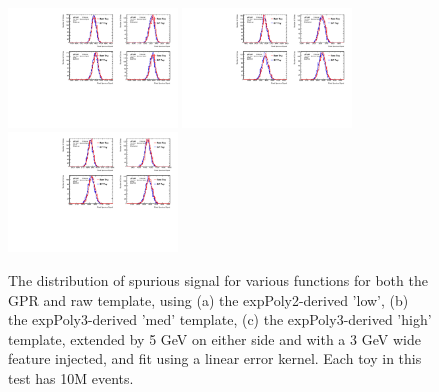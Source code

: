 \begin{figure} 
\begin{center}
  \includegraphics[width=0.4\textwidth]{figures/background/gpr/validation/linear/ToyTest_FitSigVals_lowpT_10M_Sig_1s}   
  \includegraphics[width=0.4\textwidth]{figures/background/gpr/validation/linear/ToyTest_FitSigVals_medpT_10M_Sig_1s}   
  \includegraphics[width=0.4\textwidth]{figures/background/gpr/validation/linear/ToyTest_FitSigVals_highpT_10M_Sig_1s}   
\caption{The distribution of spurious signal for various functions for both the GPR and raw template, using (a) the expPoly2-derived 'low', (b) the expPoly3-derived 'med' template, (c) the expPoly3-derived 'high' template, extended by 5 GeV on either side and with a 3 GeV wide feature injected, and fit using a linear error kernel. Each toy in this test has 10M events.}
\label{fig:linearkernel_lowpt_10M_Sig_1s}
\end{center}
\end{figure}
				
